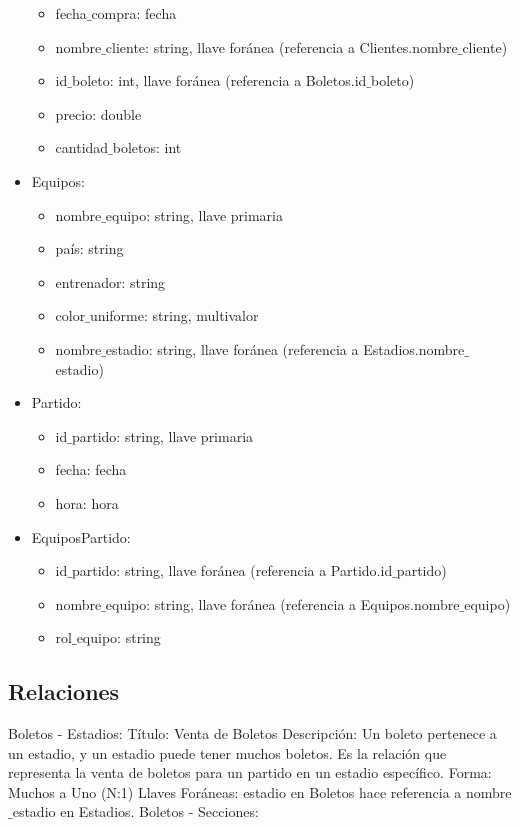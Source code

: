 \begin{itemize}
\begin{itemize}
        \item fecha$\_$compra: fecha
        \item nombre$\_$cliente: string,  llave foránea (referencia a Clientes.nombre$\_$cliente)
        \item id$\_$boleto: int, llave foránea (referencia a Boletos.id$\_$boleto)
        \item precio: double
        \item cantidad$\_$boletos: int
    \end{itemize}
    \item Equipos:
    \begin{itemize}
        \item nombre$\_$equipo: string, llave primaria
        \item país: string
        \item entrenador: string
        \item color$\_$uniforme: string, multivalor
        \item nombre$\_$estadio: string, llave foránea (referencia a Estadios.nombre$\_$estadio)
    \end{itemize}
    \item Partido:
    \begin{itemize}
        \item id$\_$partido: string, llave primaria
        \item fecha: fecha
        \item hora: hora
    \end{itemize}
    \item EquiposPartido:
    \begin{itemize}        
        \item id$\_$partido: string, llave foránea (referencia a Partido.id$\_$partido)
        \item nombre$\_$equipo: string, llave foránea (referencia a Equipos.nombre$\_$equipo)        
        \item rol$\_$equipo: string
    \end{itemize}
\end{itemize}

\subsection*{Relaciones}

Boletos - Estadios:
Título: Venta de Boletos
Descripción: Un boleto pertenece a un estadio, y un estadio puede tener muchos boletos. Es la relación que representa la venta de boletos para un partido en un estadio específico.
Forma: Muchos a Uno (N:1)
Llaves Foráneas: estadio en Boletos hace referencia a nombre$\_$estadio en Estadios.
Boletos - Secciones:


